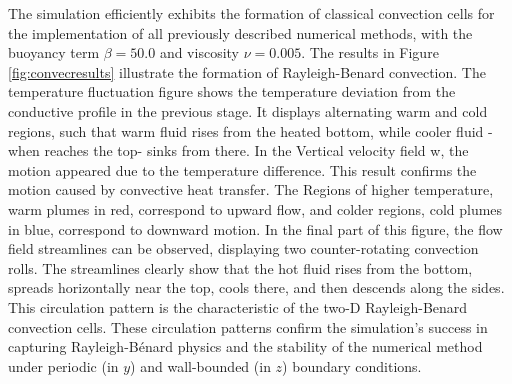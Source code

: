 The simulation efficiently exhibits the formation of classical convection cells for the implementation of all previously described numerical methods, with the buoyancy term $\beta =50.0$ and viscosity $\nu =0.005$. 
The results in Figure \ref{fig:convecresults} illustrate the formation of Rayleigh-Benard convection. The temperature fluctuation figure shows the temperature deviation from the conductive profile in the previous stage. It displays alternating warm and cold regions, such that warm fluid rises from the heated bottom, while cooler fluid -when reaches the top- sinks from there. In the Vertical velocity field w, the motion appeared due to the temperature difference. This result confirms the motion caused by convective heat transfer. The Regions of higher temperature, warm plumes in red, correspond to upward flow, and colder regions, cold plumes in blue, correspond to downward motion. In the final part of this figure, the flow field streamlines can be observed, displaying two counter-rotating convection rolls. The streamlines clearly show that the hot fluid rises from the bottom, spreads horizontally near the top, cools there, and then descends along the sides. This circulation pattern is the characteristic of the two-D Rayleigh-Benard convection cells.
These circulation patterns confirm the simulation's success in capturing Rayleigh-B\'{e}nard physics and the stability of the numerical method under periodic (in $y$) and wall-bounded (in $z$) boundary conditions.